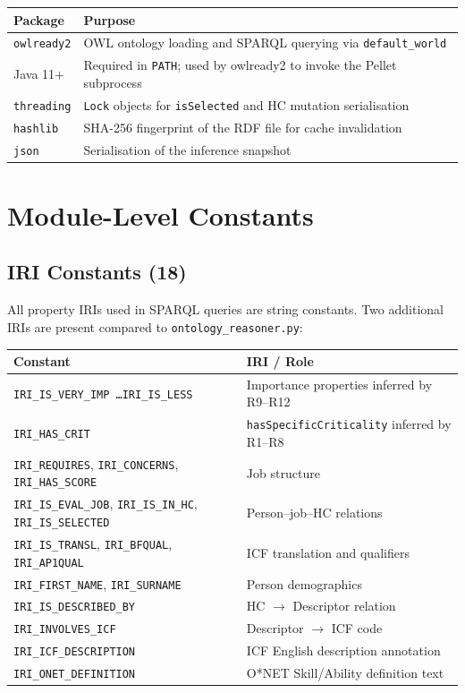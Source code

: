 ﻿\documentclass[12pt,a4paper]{article}
\begin{document}
\begin{longtable}{@{}P{3.5cm}P{11cm}@{}}
\toprule
\textbf{Package} & \textbf{Purpose} \\
\midrule
\endhead
\texttt{owlready2} & OWL ontology loading and SPARQL querying via \texttt{default\_world} \\
Java 11+ & Required in \texttt{PATH}; used by owlready2 to invoke the Pellet subprocess \\
\texttt{threading} & \texttt{Lock} objects for \texttt{isSelected} and HC mutation serialisation \\
\texttt{hashlib} & SHA-256 fingerprint of the RDF file for cache invalidation \\
\texttt{json} & Serialisation of the inference snapshot \\
\bottomrule
\end{longtable}

\clearpage
\section{Module-Level Constants}

\subsection{IRI Constants (18)}

All property IRIs used in SPARQL queries are string constants. Two additional IRIs are present compared to \texttt{ontology\_reasoner.py}:

\begin{longtable}{@{}P{5cm}P{9.5cm}@{}}
\toprule
\textbf{Constant} & \textbf{IRI / Role} \\
\midrule
\endhead
\texttt{IRI\_IS\_VERY\_IMP \ldots IRI\_IS\_LESS} & Importance properties inferred by R9--R12 \\
\texttt{IRI\_HAS\_CRIT} & \texttt{hasSpecificCriticality} inferred by R1--R8 \\
\texttt{IRI\_REQUIRES}, \texttt{IRI\_CONCERNS}, \texttt{IRI\_HAS\_SCORE} & Job structure \\
\texttt{IRI\_IS\_EVAL\_JOB}, \texttt{IRI\_IS\_IN\_HC}, \texttt{IRI\_IS\_SELECTED} & Person--job--HC relations \\
\texttt{IRI\_IS\_TRANSL}, \texttt{IRI\_BFQUAL}, \texttt{IRI\_AP1QUAL} & ICF translation and qualifiers \\
\texttt{IRI\_FIRST\_NAME}, \texttt{IRI\_SURNAME} & Person demographics \\
\texttt{IRI\_IS\_DESCRIBED\_BY} & HC $\to$ Descriptor relation \\
\texttt{IRI\_INVOLVES\_ICF} & Descriptor $\to$ ICF code \\
\texttt{IRI\_ICF\_DESCRIPTION} & ICF English description annotation \\
\texttt{IRI\_ONET\_DEFINITION} & O*NET Skill/Ability definition text \\
\bottomrule
\end{longtable}
\end{document}
